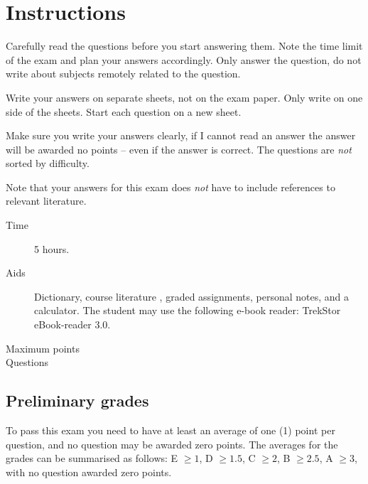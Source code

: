 \documentclass[addpoints,svv]{miunexam}
\date{2014-08-20}
\author{%
	Daniel Bosk\\
  {\small\texttt{\href{mailto:daniel.bosk@miun.se}{daniel.bosk@miun.se}}}\\
  {\small\textit{Phone:} 060\,-\,14\,8709}\\
}
\begin{document}
\maketitle
\thispagestyle{foot}

\section*{Instructions}
\label{sec:Instructions}
Carefully read the questions before you start answering them.
Note the time limit of the exam and plan your answers accordingly.
Only answer the question, do not write about subjects remotely related to the
question.

Write your answers on separate sheets, not on the exam paper.
Only write on one side of the sheets.
Start each question on a new sheet.

Make sure you write your answers clearly, if I cannot read an answer the answer
will be awarded no points -- even if the answer is correct.
The questions are \emph{not} sorted by difficulty.

Note that your answers for this exam does \emph{not} have to include references 
to relevant literature.

\begin{description}
	\item[Time] 5 hours.
  \item[Aids] Dictionary,
    course literature 
    \cite{Silberschatz2009osc,Silberschatz2013osc,Silberschatz2013intl},
    graded assignments,
    personal notes,
    and a calculator.
    The student may use the following e-book reader:
    TrekStor eBook-reader 3.0.
	\item[Maximum points] \numpoints
	\item[Questions] \numquestions
\end{description}


\subsection*{Preliminary grades}

To pass this exam you need to have at least an average of one (1) point per 
question, and no question may be awarded zero points.
The averages for the grades can be summarised as follows:
E \(\geq 1\),
D \(\geq 1.5\),
C \(\geq 2\),
B \(\geq 2.5\),
A \(\geq 3\),
with no question awarded zero points.
\end{document}
